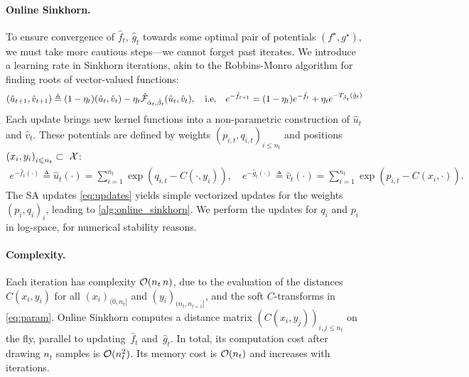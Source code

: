 \paragraph{Online Sinkhorn.}

To ensure convergence of $\hat f_t$, $\hat g_t$ towards some optimal pair of potentials
$(f^\star, g^\star)$, we must take more
cautious steps---we cannot forget past iterates. We introduce a learning
rate in Sinkhorn iterations, akin to the Robbins-Monro algorithm for finding
roots of vector-valued functions:
\begin{equation}\label{eq:updates}
    (\hat u_{t+1}, \hat v_{t+1}) \triangleq (1 - \eta_t) (\hat u_t, \hat v_t) 
    - \eta_t \hat \Ff_{\hat \alpha_t, \hat \beta_t}(\hat u_t, \hat v_t),\quad\text{i.e.}\quad
    e^{-\hat f_{t+1}} = (1 - \eta_t) e^{-\hat f_{t}} + 
    \eta_t e^{-\Ctrans{\hat g_t}{\hat \beta_t}}
\end{equation}
Each update brings new kernel functions into a non-parametric construction of
$\hat u_t$ and $\hat v_t$. These potentials are defined by weights ${(p_{i,t},
q_{i,t})}_{i \leq n_t}$ and positions ${(x_i, y_i)}_{i \leq n_t} \subset~\Xx$:
\begin{align}\label{eq:param}
    e^{-\hat f_t(\cdot)} \triangleq \hat u_t(\cdot) = \sum_{i=1}^{n_t} 
    \exp(q_{i,t} - C(\cdot, y_i)),\quad
    e^{-\hat g_t(\cdot)} \triangleq \hat v_t(\cdot) = \sum_{i=1}^{n_t}
    \exp(p_{i,t} - C(x_i, \cdot)).
\end{align}
The SA updates \eqref{eq:updates} yields simple vectorized updates for the weights
${(p_i,q_i)}_i$, leading to \autoref{alg:online_sinkhorn}. We perform
the updates for $q_i$ and $p_i$ in log-space, for numerical stability reasons.

\paragraph{Complexity.}

Each iteration has complexity $\Oo(n_t\,n)$, due to the evaluation of the
distances $C(x_i, y_i)$ for all $(x_i)_{(0, n_t]}$ and $(y_i)_{(n_t, n_{t+1}]}$,
and the soft $C$-transforms in \eqref{eq:param}. Online Sinkhorn computes a distance matrix
$(C(x_i,y_j))_{i,j \leq n_t}$ on the fly, parallel to updating~$\hat f_t$
and~$\hat g_t$. In total, its computation cost after drawing $n_t$ samples is
$\Oo(n_t^2)$. Its memory cost is $\Oo(n_t)$ and increases with iterations.

